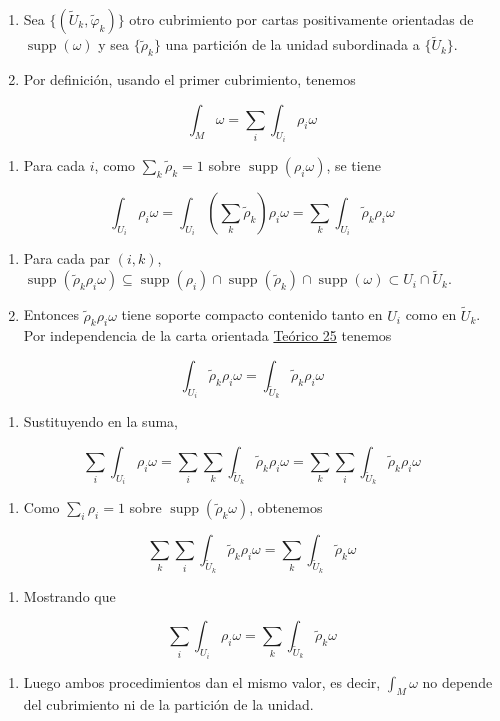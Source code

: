 \begin{bookproof}{}
\begin{enumerate}
\item Sea $\{(\widetilde U_k,\widetilde\varphi_k)\}$ otro cubrimiento por cartas positivamente orientadas de $\operatorname{supp}(\omega)$ y sea $\{\widetilde\rho_k\}$ una partición de la unidad subordinada a $\{\widetilde U_k\}$.
\item Por definición, usando el primer cubrimiento, tenemos
\end{enumerate}
\[
\int_M\omega=\sum_i\int_{U_i}\rho_i\omega
\]
\begin{enumerate}[start=3]
\item Para cada $i$, como $\sum_k\widetilde\rho_k=1$ sobre $\operatorname{supp}(\rho_i\omega)$, se tiene
\end{enumerate}
\[
\int_{U_i}\rho_i\omega=\int_{U_i}\left(\sum_k\widetilde\rho_k\right)\rho_i\omega=\sum_k\int_{U_i}\widetilde\rho_k\rho_i\omega
\]
\begin{enumerate}[start=4]
\item Para cada par $(i,k)$, $\operatorname{supp}(\widetilde\rho_k\rho_i\omega)\subseteq\operatorname{supp}(\rho_i)\cap\operatorname{supp}(\widetilde\rho_k)\cap\operatorname{supp}(\omega)\subset U_i\cap\widetilde U_k$.
\item Entonces $\widetilde\rho_k\rho_i\omega$ tiene soporte compacto contenido tanto en $U_i$ como en $\widetilde U_k$. Por independencia de la carta orientada \hyperref[blk:4bb08e]{Teórico 25} tenemos
\end{enumerate}
\[
\int_{U_i}\widetilde\rho_k\rho_i\omega=\int_{\widetilde U_k}\widetilde\rho_k\rho_i\omega
\]
\begin{enumerate}[start=6]
\item Sustituyendo en la suma,
\end{enumerate}
\[
\sum_i\int_{U_i}\rho_i\omega=\sum_i\sum_k\int_{\widetilde U_k}\widetilde\rho_k\rho_i\omega=\sum_k\sum_i\int_{\widetilde U_k}\widetilde\rho_k\rho_i\omega
\]
\begin{enumerate}[start=7]
\item Como $\sum_i\rho_i=1$ sobre $\operatorname{supp}(\widetilde\rho_k\omega)$, obtenemos
\end{enumerate}
\[
\sum_k\sum_i\int_{\widetilde U_k}\widetilde\rho_k\rho_i\omega=\sum_k\int_{\widetilde U_k}\widetilde\rho_k\omega
\]
\begin{enumerate}[start=8]
\item Mostrando que
\end{enumerate}
\[
\sum_i\int_{U_i}\rho_i\omega=\sum_k\int_{\widetilde U_k}\widetilde\rho_k\omega
\]
\begin{enumerate}[start=9]
\item Luego ambos procedimientos dan el mismo valor, es decir, $\int_M\omega$ no depende del cubrimiento ni de la partición de la unidad.
\end{enumerate}
\bookqed
\end{bookproof}
